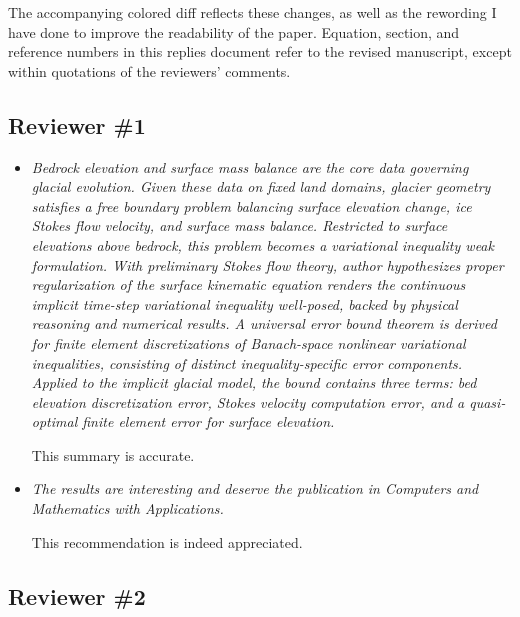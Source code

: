 \documentclass[11pt,reqno]{amsart}
\newcommand{\reply}[2]{%
\medskip
\item \emph{#1}

\medskip
\noindent #2
}
\begin{document}
The accompanying colored diff reflects these changes, as well as the rewording I have done to improve the readability of the paper.  Equation, section, and reference numbers in this replies document refer to the revised manuscript, except within quotations of the reviewers' comments.

\subsection*{Reviewer \#1}

\begin{itemize}[itemindent=0mm, labelsep=5mm]
\reply{Bedrock elevation and surface mass balance are the core data governing glacial evolution. Given these data on fixed land domains, glacier geometry satisfies a free boundary problem balancing surface elevation change, ice Stokes flow velocity, and surface mass balance. Restricted to surface elevations above bedrock, this problem becomes a variational inequality weak formulation. With preliminary Stokes flow theory, author hypothesizes proper regularization of the surface kinematic equation renders the continuous implicit time-step variational inequality well-posed, backed by physical reasoning and numerical results. A universal error bound theorem is derived for finite element discretizations of Banach-space nonlinear variational inequalities, consisting of distinct inequality-specific error components. Applied to the implicit glacial model, the bound contains three terms: bed elevation discretization error, Stokes velocity computation error, and a quasi-optimal finite element error for surface elevation.}
{This summary is accurate.}

\reply{The results are interesting and deserve the publication in Computers and Mathematics with Applications.}
{This recommendation is indeed appreciated.}
\end{itemize}


\subsection*{Reviewer \#2}
\end{document}
